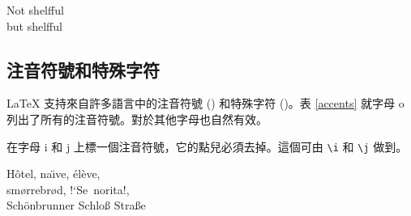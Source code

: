 \begin{example}
Not shelfful\\
but shelf\mbox{}ful
\end{example}

\subsection{注音符號和特殊字符}

\LaTeX{} 支持來自許多語言中的注音符號 () 和特殊字符 ()。表 \ref{accents} 
就字母 o 列出了所有的注音符號。對於其他字母也自然有效。

在字母 i 和 j 上標一個注音符號，它的點兒必須去掉。這個可由 \verb|\i| 和 \verb|\j| 做到。

\begin{example}
H\^otel, na\"\i ve, \'el\`eve,\\
sm\o rrebr\o d, !`Se\ norita!,\\
Sch\"onbrunner Schlo\ss{}
Stra\ss e
\end{example}

